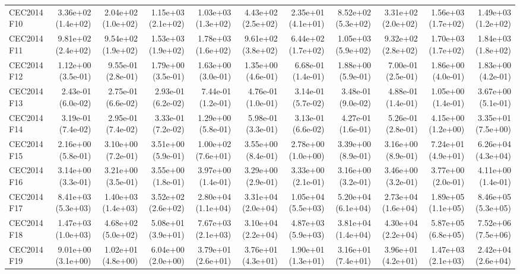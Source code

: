 \begin{longtable}{lrrrrrrrrrr}
CEC2014 F10 & 3.36e+02 (1.4e+02) & 2.04e+02 (1.0e+02) & 1.15e+03 (2.1e+02) & 1.03e+03 (1.3e+02) & 4.43e+02 (2.5e+02) & 2.35e+01 (4.1e+01) & 8.52e+02 (5.3e+02) & 3.31e+02 (2.0e+02) & 1.56e+03 (1.7e+02) & 1.49e+03 (1.2e+02) \\
CEC2014 F11 & 9.81e+02 (2.4e+02) & 9.54e+02 (1.9e+02) & 1.53e+03 (1.9e+02) & 1.78e+03 (1.6e+02) & 9.61e+02 (3.8e+02) & 6.44e+02 (1.7e+02) & 1.05e+03 (5.9e+02) & 9.32e+02 (2.8e+02) & 1.70e+03 (1.7e+02) & 1.84e+03 (1.8e+02) \\
CEC2014 F12 & 1.12e+00 (3.5e-01) & 9.55e-01 (2.8e-01) & 1.79e+00 (3.5e-01) & 1.63e+00 (3.0e-01) & 1.35e+00 (4.6e-01) & 6.68e-01 (1.4e-01) & 1.88e+00 (5.9e-01) & 7.00e-01 (2.5e-01) & 1.86e+00 (4.0e-01) & 1.83e+00 (4.2e-01) \\
CEC2014 F13 & 2.43e-01 (6.0e-02) & 2.75e-01 (6.6e-02) & 2.93e-01 (6.2e-02) & 7.44e-01 (1.2e-01) & 4.76e-01 (1.0e-01) & 3.14e-01 (5.7e-02) & 3.48e-01 (9.0e-02) & 4.88e-01 (1.4e-01) & 1.05e+00 (1.4e-01) & 3.67e+00 (5.1e-01) \\
CEC2014 F14 & 3.19e-01 (7.4e-02) & 2.95e-01 (7.4e-02) & 3.33e-01 (7.2e-02) & 1.29e+00 (5.8e-01) & 5.98e-01 (3.3e-01) & 3.13e-01 (6.6e-02) & 4.27e-01 (1.6e-01) & 5.26e-01 (2.8e-01) & 4.15e+00 (1.2e+00) & 3.35e+01 (7.5e+00) \\
CEC2014 F15 & 2.16e+00 (5.8e-01) & 3.10e+00 (7.2e-01) & 3.51e+00 (5.9e-01) & 1.00e+02 (7.6e+01) & 3.55e+00 (8.4e-01) & 2.78e+00 (1.0e+00) & 3.39e+00 (8.9e-01) & 3.16e+00 (8.9e-01) & 7.24e+01 (4.9e+01) & 6.26e+04 (4.3e+04) \\
CEC2014 F16 & 3.14e+00 (3.3e-01) & 3.21e+00 (3.5e-01) & 3.55e+00 (1.8e-01) & 3.97e+00 (1.4e-01) & 3.29e+00 (2.9e-01) & 3.33e+00 (2.1e-01) & 3.16e+00 (3.2e-01) & 3.46e+00 (3.2e-01) & 3.77e+00 (2.0e-01) & 4.11e+00 (1.4e-01) \\
CEC2014 F17 & 8.41e+03 (5.3e+03) & 1.40e+03 (1.4e+03) & 3.52e+02 (2.6e+02) & 2.80e+04 (1.1e+04) & 3.31e+04 (2.0e+04) & 1.05e+04 (5.5e+03) & 5.20e+04 (6.1e+04) & 2.73e+04 (1.6e+04) & 1.89e+05 (1.1e+05) & 8.46e+05 (5.3e+05) \\
CEC2014 F18 & 1.47e+03 (1.0e+03) & 4.68e+02 (5.0e+02) & 5.08e+01 (3.9e+01) & 7.67e+03 (2.1e+03) & 3.10e+04 (2.2e+04) & 4.87e+03 (5.9e+03) & 3.81e+04 (1.4e+04) & 4.30e+04 (2.2e+04) & 5.87e+05 (6.8e+05) & 7.52e+06 (7.5e+06) \\
CEC2014 F19 & 9.01e+00 (3.1e+00) & 1.02e+01 (4.8e+00) & 6.04e+00 (2.0e+00) & 3.79e+01 (2.6e+01) & 3.76e+01 (4.3e+01) & 1.90e+01 (1.3e+01) & 3.16e+01 (7.4e+01) & 3.96e+01 (4.2e+01) & 1.47e+03 (2.1e+03) & 2.42e+04 (2.6e+04) \\

\end{longtable}
